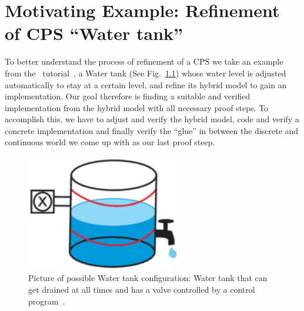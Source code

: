 



\chapter{Motivating Example: Refinement of CPS ``Water tank''}
\label{ch:Watertank}

To better understand the process of refinement of a CPS we take an example from the \keym~tutorial~\cite{keymaera}, a Water tank (See Fig.~\ref{fig:watertank}) whose water level is adjusted automatically to stay at a certain level, and refine its hybrid model to gain an implementation. Our goal therefore is finding a suitable and verified implementation from the hybrid model with all necessary proof steps. To accomplish this, we have to adjust and verify the hybrid model, code and verify a concrete implementation and finally verify the ``glue'' in between the discrete and continuous world we come up with as our last proof steep. 

\begin{figure}[h!]
	\setcounter{figure}{0}
	\centering
	\includegraphics[width=0.6\textwidth]{images/watertank}
	\caption{Picture of possible Water tank configuration: Water tank that can get drained at all times and has a valve controlled by a control program~\cite{keymaeraGuide}.}
	\label{fig:watertank}
\end{figure}

